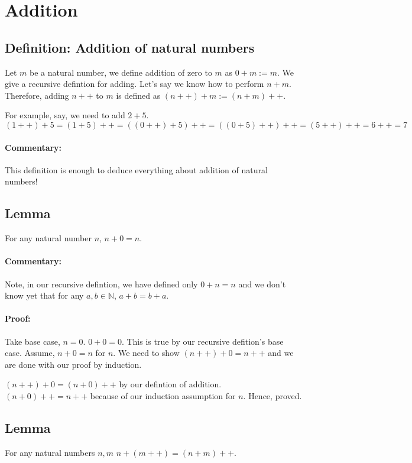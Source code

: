 \documentclass{report}
\begin{document}
\section{Addition}
\subsection{Definition: Addition of natural numbers}
Let $m$ be a natural number, we define addition of zero to $m$ as $0 + m := m$. We give a recursive defintion for adding. Let's say we know how to perform $n + m$. Therefore, adding  $n++$ to $m$ is defined as $\left( n++ \right) +m := \left( n+m \right) ++$.

For example, say, we need to add $2 + 5$.  $\left( 1++ \right) +5 = \left( 1 + 5 \right) ++ = \left( \left( 0++ \right) +5 \right) ++ = \left( \left( 0 + 5 \right) ++ \right) ++ = \left( 5++ \right) ++ = 6++ = 7 $
\paragraph{Commentary:} This definition is enough to deduce everything about addition of natural numbers!
\subsection{Lemma} For any natural number $n$, $n+0 = n$. 


\paragraph{Commentary:} Note, in our recursive defintion, we have defined only $0+n=n$ and we don't know yet that for any $a,b \in \mathbb{N}$, $a+b=b+a$.
\paragraph{Proof:} Take base case, $n = 0$. $0+0=0$. This is true by our recursive defition's base case. Assume, $n+0 = n$ for $n$. We need to show $(n++)+0 = n++$ and we are done with our proof by induction. 

 $\left( n++ \right) +0 = \left( n + 0 \right) ++ $ by our defintion of addition. $\left( n+0 \right) ++ = n++$ because of our induction assumption for $n$. Hence, proved.

 \subsection{Lemma} For any natural numbers $n,m$ $n+\left( m++ \right) = \left( n+m \right) ++$.
\end{document}

